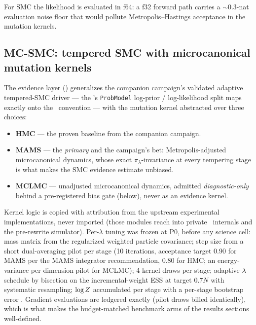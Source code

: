 For SMC the likelihood is evaluated in f64: a f32 forward path carries a
$\sim$0.3-nat evaluation noise floor that would pollute
Metropolis--Hastings acceptance in the mutation kernels.

\subsection{MC-SMC: tempered SMC with microcanonical mutation kernels}
\label{sec:mcsmc-a}

The evidence layer () generalizes the
companion campaign's validated adaptive tempered-SMC driver
\citep{delmoral2006smc} --- the \sceneapi's \texttt{ProbModel} log-prior
/ log-likelihood split maps exactly onto the \blackjax\ convention ---
with the mutation kernel abstracted over three choices:

\begin{itemize}
\item \textbf{HMC} --- the proven baseline from the companion campaign.
\item \textbf{MAMS} \citep{robnik2024mams} --- the \emph{primary} and the
  campaign's bet: Metropolis-adjusted microcanonical dynamics, whose
  exact $\pi_\lambda$-invariance at every tempering stage is what makes
  the SMC evidence estimate unbiased.
\item \textbf{MCLMC} \citep{robnik2023mclmc} --- unadjusted microcanonical
  dynamics, admitted \emph{diagnostic-only} behind a pre-registered bias
  gate (below), never as an evidence kernel.
\end{itemize}

Kernel logic is copied with attribution from the upstream experimental
implementations, never imported (those modules reach into private
\blackjax\ internals and the pre-rewrite simulator). Per-$\lambda$ tuning
was frozen at P0, before any science cell: mass matrix from the
regularized weighted particle covariance; step size from a short
dual-averaging pilot per stage (10 iterations, acceptance target 0.90 for
MAMS per the MAMS integrator recommendation, 0.80 for HMC; an
energy-variance-per-dimension pilot for MCLMC); 4 kernel draws per stage;
adaptive $\lambda$-schedule by bisection on the incremental-weight ESS at
target $0.7N$ with systematic resampling; $\log Z$ accumulated per stage
with a per-stage bootstrap error \sboot. Gradient evaluations are
ledgered exactly (pilot draws billed identically), which is what makes the
budget-matched benchmark arms of the results sections well-defined.

